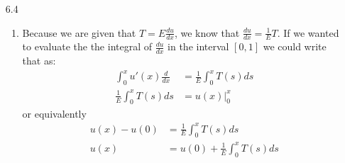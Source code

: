 \documentclass[11pt,a4paper]{article}
\begin{document}
\begin{itemize}
			\item[6.4]
				\begin{enumerate} [label={\alph*)}]
					\item Because we are given that $T=E\frac{du}{dx}$, we know that $\frac{du}{dx} = \frac{1}{E}T$. If we wanted to evaluate the the integral of  $\frac{du}{dx}$ in the interval $[0,1]$ we could write that as:
					\begin{align*}
						\int_{0}^{x}u'(x)\frac{d}{dx} &= \frac{1}{E}\int_{0}^{x}T(s)ds \\
						\frac{1}{E}\int_{0}^{x}T(s)ds &= u(x)\Big\vert_{0}^{x}
					\end{align*}
					or equivalently
					\begin{align*}
						u(x) - u(0) &= \frac{1}{E}\int_{0}^{x}T(s)ds \\
						u(x) &= u(0) + \frac{1}{E}\int_{0}^{x}T(s)ds
					\end{align*}
					

\end{enumerate}
\end{itemize}
\end{document}
